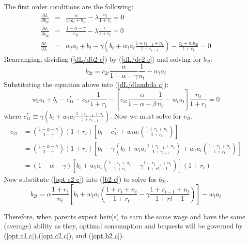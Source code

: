 \documentclass{article}
\begin{document}
The first order conditions are the following:
\begin{eqnarray}
\frac{\partial L}{\partial b_{2t}} &=& \frac{\alpha}{w_t a_t + b_{2t}} - \lambda \frac{n_t}{1+r_t} = 0\label{dL/db2 c}\\
\frac{\partial L}{\partial c_{2t}} &=& \frac{1-\alpha-\gamma}{c_{2t}}-\lambda\frac{1}{1+r_t} = 0\label{dL/dc2 c}\\
\frac{\partial L}{\partial \lambda} &=& w_t a_t + b_t - \gamma(b_t+w_t a_t \frac{1+r_{t-1}+n_t}{1+r_{t-1}} ) - \frac{c_{2} + n_t b_{2t}}{1+r_t} = 0\label{dL/dlambda c}
\end{eqnarray}
Rearranging, dividing (\ref{dL/db2 c}) by (\ref{dL/dc2 c}) and solving for $b_{2t}$:
\begin{equation}\label{b2 c}
b_{2t} = c_{2t}\frac{\alpha}{1-\alpha-\gamma}\frac{1}{n_t}-w_t a_t
\end{equation}
Substituting the equation above into (\ref{dL/dlambda c}):
\begin{equation}
w_t a_t + b_t - c^{*}_{1t} - c_{2t}\frac{1}{1+r_t} - [c_{2t}\frac{\alpha}{1-\alpha-\beta}\frac{1}{n_t}-w_t a_t]\frac{n_t}{1+r_t} = 0
\end{equation}
where $c^{*}_{1t} \equiv \gamma(b_t + w_t a_t\frac{1+r_{t-1}+n_t}{1+r_{t-1}} )$.  Now we must solve for $c_{2t}$.
\begin{equation}\label{opt c2 c}
\begin{split}
c_{2t} 
&= (\frac{1-\alpha-\gamma}{1-\gamma})(1+r_t)[ b_t-c^{*}_{1t} + w_t a_t (\frac{1+r_t+n_t}{1+r_t}) ]\\
&= (\frac{1-\alpha-\gamma}{1-\gamma})(1+r_t)[ b_t-\gamma(b_t + w_t a_t\frac{1+r_{t-1}+n_t}{1+r_{t-1}} ) + w_t a_t (\frac{1+r_t+n_t}{1+r_t}) ]\\
&= (1-\alpha-\gamma)[b_t + w_t a_t (\frac{1+r_t+n_t}{1+r_t}-\gamma \frac{1+r_{t-1}+n_t}{1+r{t-1}})](1+r_t)
\end{split}
\end{equation}
Now substitute (\ref{opt c2 c}) into (\ref{b2 c}) to solve for $b_{2t}$.
\begin{equation}\label{opt b2 c}
b_{2t} = \alpha\frac{1+r_t}{n_t}[b_t + w_t a_t (\frac{1+r_t+n_t}{1+r_t}-\gamma \frac{1+r_{t-1}+n_t}{1+r{t-1}})] - w_t a_t
\end{equation}

Therefore, when parents expect heir(s) to earn the same wage and have the same (average) ability as they, optimal consumption and bequests will be governed by (\ref{opt c1 c}),(\ref{opt c2 c}), and (\ref{opt b2 c}).
\end{document}
